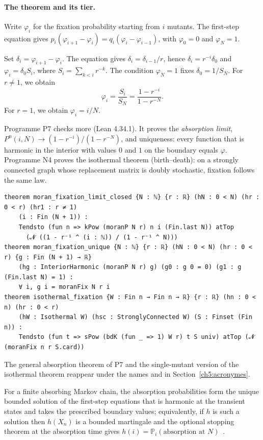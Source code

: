 \paragraph{The theorem and its tier.} Write $\varphi_i$ for the fixation probability starting from $i$ mutants. The
first-step equation gives $p_i(\varphi_{i+1}-\varphi_i)=q_i(\varphi_i-\varphi_{i-1})$, with $\varphi_0=0$ and
$\varphi_N=1$.
\begin{humanproof}
Set $\delta_i=\varphi_{i+1}-\varphi_i$. The equation gives $\delta_i=\delta_{i-1}/r$, hence $\delta_i=r^{-i}\delta_0$
and $\varphi_i=\delta_0S_i$, where $S_i=\sum_{k<i}r^{-k}$. The condition $\varphi_N=1$ fixes
$\delta_0=1/S_N$. For $r\ne1$, we obtain
\[\varphi_i=\frac{S_i}{S_N}=\frac{1-r^{-i}}{1-r^{-N}} .\]
For $r=1$, we obtain $\varphi_i=i/N$.
\end{humanproof}
Programme P7 checks more \tierA{} (Lean 4.34.1). It proves the \emph{absorption limit},
$P^n(i,N)\to(1-r^{-i})/(1-r^{-N})$, and uniqueness: every function that is harmonic in the interior with values $0$ and
$1$ on the boundary equals $\varphi$. Programme N4 proves the isothermal theorem (birth--death): on a
strongly connected graph whose replacement matrix is doubly stochastic, fixation follows the same law.
\begin{leanbox}
\begin{lstlisting}[language=Lean]
theorem moran_fixation_limit_closed {N : ℕ} {r : ℝ} (hN : 0 < N) (hr : 0 < r) (hr1 : r ≠ 1)
    (i : Fin (N + 1)) :
    Tendsto (fun n => kPow (moranP N r) n i (Fin.last N)) atTop
      (𝓝 ((1 - r⁻¹ ^ (i : ℕ)) / (1 - r⁻¹ ^ N)))
theorem moran_fixation_unique {N : ℕ} {r : ℝ} (hN : 0 < N) (hr : 0 < r) {g : Fin (N + 1) → ℝ}
    (hg : InteriorHarmonic (moranP N r) g) (g0 : g 0 = 0) (g1 : g (Fin.last N) = 1) :
    ∀ i, g i = moranFix N r i
theorem isothermal_fixation {W : Fin n → Fin n → ℝ} {r : ℝ} (hn : 0 < n) (hr : 0 < r)
    (hW : Isothermal W) (hsc : StronglyConnected W) (S : Finset (Fin n)) :
    Tendsto (fun t => sPow (bdK (fun _ => 1) W r) t S univ) atTop (𝓝 (moranFix n r S.card))
\end{lstlisting}
\end{leanbox}
The general absorption theorem of P7 and the single-mutant version of the isothermal theorem reappear under
the names  and  in Section~\ref{ch5:acronymes}.

\begin{uniremark}\tierL{} For a finite absorbing Markov chain, the absorption probabilities form the unique bounded
solution of the first-step equations that is harmonic at the transient states and takes the prescribed boundary values;
equivalently, if $h$ is such a solution then $h(X_n)$ is a bounded martingale and the optional stopping theorem at the
absorption time gives $h(i)=\mathbb P_i(\text{absorption at }N)$~\cite{app:norris,app:williams}.
\end{uniremark}


